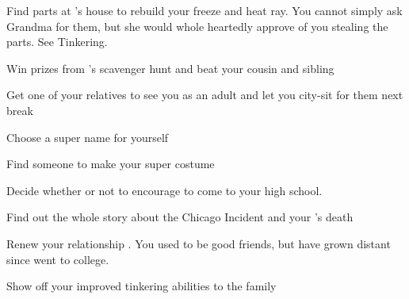 \documentclass[char]{LRSguildcamp1}
\begin{document}
 
\begin{itemz}[Goals]
	\item Find parts at \cGrandma{}'s house to rebuild your freeze and heat ray. You cannot simply ask Grandma for them, but she would whole heartedly approve of you stealing the parts. See Tinkering. 
	\item Win prizes from \cGrandma{}'s scavenger hunt and beat your cousin and sibling
	
		\item Get one of your relatives to see you as an adult and let you city-sit for them next break
		
		\item Choose a super name for yourself
		
		\item Find someone to make your super costume 
		
		\item Decide whether or not to encourage \cTween{} to come to your high school.
		
		\item Find out the whole story about the Chicago Incident and your \cAS{\paren}'s death
		
		\item Renew your relationship \cGrad{}. You used to be good friends, but have grown distant since \cGrad{} went to college.
		
		\item Show off your improved tinkering abilities to the family

		
\end{itemz}
\end{document}
